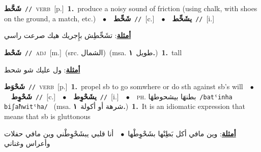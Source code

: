 \documentclass[10pt,a4paper,twoside]{article} %
\begin{document}
\begin{multicols}{2}
{\setlength\topsep{0pt}\textbf{\foreignlanguage{arabic}{شَحَّط}}\ {\color{gray}\texttt{//}\color{black}}\ \textsc{verb}\ [p.]\ \textbf{1.}~produce a noisy sound of friction (using chalk, with shoes on the ground, a match, etc.)\ \ $\bullet$\ \ \setlength\topsep{0pt}\textbf{\foreignlanguage{arabic}{شَحِّط}}\ {\color{gray}\texttt{//}\color{black}}\ [c.]\ \ $\bullet$\ \ \setlength\topsep{0pt}\textbf{\foreignlanguage{arabic}{يشَحِّط}}\ {\color{gray}\texttt{//}\color{black}}\ [i.]\  \begin{flushright}\color{gray}\foreignlanguage{arabic}{\textbf{\underline{\foreignlanguage{arabic}{أمثلة}}}: تشَحِّطِش بإِجريك هيك صرعت راسي}\end{flushright}\color{black}} \vspace{2mm}

{\setlength\topsep{0pt}\textbf{\foreignlanguage{arabic}{شَحْط}}\ {\color{gray}\texttt{//}\color{black}}\ \textsc{adj}\ [m.]\ (src. \color{gray}\foreignlanguage{arabic}{الشمال}\color{black})\ \color{gray}(msa. \foreignlanguage{arabic}{طويل}~\foreignlanguage{arabic}{\textbf{١.}})\color{black}\ \textbf{1.}~tall\  \begin{flushright}\color{gray}\foreignlanguage{arabic}{\textbf{\underline{\foreignlanguage{arabic}{أمثلة}}}: ول عليك شو شحط}\end{flushright}\color{black}} \vspace{2mm}

{\setlength\topsep{0pt}\textbf{\foreignlanguage{arabic}{شَحْوَط}}\ {\color{gray}\texttt{//}\color{black}}\ \textsc{verb}\ [p.]\ \textbf{1.}~propel sb to go somwhere or do sth against sb's will\ \ $\bullet$\ \ \setlength\topsep{0pt}\textbf{\foreignlanguage{arabic}{شَحْوِط}}\ {\color{gray}\texttt{//}\color{black}}\ [c.]\ \ $\bullet$\ \ \setlength\topsep{0pt}\textbf{\foreignlanguage{arabic}{يشَحْوِط}}\ {\color{gray}\texttt{//}\color{black}}\ [i.]\ \ $\bullet$\ \ \textsc{ph.} \color{gray} \foreignlanguage{arabic}{بطنهَا بيشحوطهَا}\color{black}\ {\color{gray}\texttt{/{\sffamily batˤinha biʃaħwitˤha}/}\color{black}}\ \color{gray} (msa. \foreignlanguage{arabic}{شرهة أو أكولة}~\foreignlanguage{arabic}{\textbf{١.}})\color{black}\ \textbf{1.}~It is an idiomatic expression that means that sb is gluttonous\  \begin{flushright}\color{gray}\foreignlanguage{arabic}{\textbf{\underline{\foreignlanguage{arabic}{أمثلة}}}: وين مافي أكل بَطِنْها بشَحْوِطْها\ $\bullet$\ \  أنا قلبي يبشَحْوِطْني وين مافي حفلات وأعراس وغناني}\end{flushright}\color{black}} \vspace{2mm}


\end{multicols}
\end{document}
